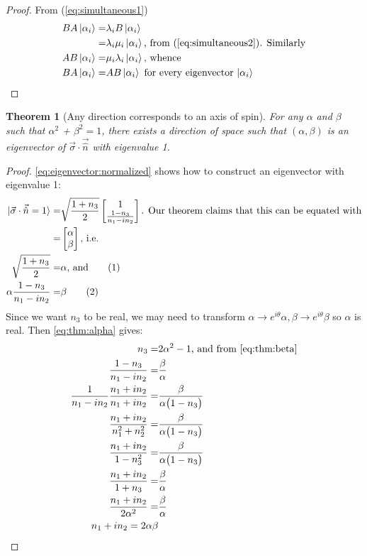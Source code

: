 \documentclass[]{article}
\newcommand\numberthis{\addtocounter{equation}{1}\tag{\theequation}}
\newtheorem{thm}{Theorem}
\begin{document}
\begin{proof}
	From (\ref{eq:simultaneous1})
	\begin{align*}
		B A\ket{\alpha_i} =& \lambda_i B \ket{\alpha_i}\\
		=& \lambda_i \mu_i \ket{\alpha_i} \text{, from (\ref{eq:simultaneous2})} \text{. Similarly}\\
		A  B \ket{\alpha_i} =& \mu_i  \lambda_i \ket{\alpha_i} \text{, whence}\\
		B A\ket{\alpha_i} =& A  B \ket{\alpha_i} \text{ for every eigenvector $\ket{\alpha_i}$}
	\end{align*}
\end{proof}
\begin{thm}[Any direction corresponds to an axis of spin]\label{thm:any:direction:corresponds}
	For any $\alpha$ and $\beta$ such that $\alpha^2$ + $\beta^2=1$, there exists a direction of space such that $(\alpha, \beta)$ is an eigenvector of $\vec{\sigma} \cdot\vec{\hat{n}}$ with eigenvalue 1.
\end{thm}
\begin{proof}
		\eqref{eq:eigenvector:normalized} shows how to construct an eigenvector with eigenvalue 1:
		\begin{align*}
			\ket{\vec{\sigma} \cdot \vec{\hat{n}}=1} =& \sqrt{\frac{1+n_3}{2}} \begin{bmatrix}
				1\\\frac{1-n_3}{n_1-i n_2}
			\end{bmatrix}\text{. Our theorem claims that this can be equated with} \\
			=& \begin{bmatrix}
				\alpha\\
				\beta
			\end{bmatrix} \text{, i.e.}\\
			\sqrt{\frac{1+n_3}{2}} =& \alpha \text{, and} \numberthis \label{eq:thm:alpha}\\
			\alpha \frac{1-n_3}{n_1-i n_2} =& \beta \numberthis \label{eq:thm:beta} 
		\end{align*}
		Since we want $n_3$ to be real, we may need to transform $\alpha \rightarrow e^{i\theta}\alpha, \beta \rightarrow e^{i\theta}\beta$ so $\alpha$ is real. Then \eqref{eq:thm:alpha} gives:
		\begin{align*}
			n_3 =& 2 \alpha^2-1 \text{, and from \eqref{eq:thm:beta}}\\
			\frac{1-n_3}{n_1-i n_2} =& \frac{\beta}{\alpha}\\
			\frac{1}{n_1-i n_2}\frac{{n_1+i n_2}}{{n_1+i n_2}}=&\frac{\beta}{\alpha\big(1-n_3\big)}\\
			\frac{{n_1+i n_2}}{{n_1^2+ n_2^2}} =& \frac{\beta}{\alpha\big(1-n_3\big)}\\
			\frac{{n_1+i n_2}}{{1- n_3^2}} =&\frac{\beta}{\alpha\big(1-n_3\big)}\\
			\frac{{n_1+i n_2}}{1+ n_3} =&\frac{\beta}{\alpha}\\
			\frac{{n_1+i n_2}}{2 \alpha^2} =&\frac{\beta}{\alpha}\\
			n_1+i n_2 = 2\alpha\beta
		\end{align*} 

\end{proof}
\end{document}
